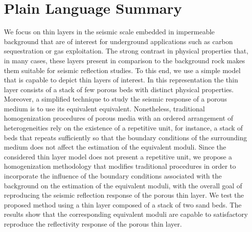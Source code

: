 \documentclass[draft]{agujournal2019}
\begin{document}
\section*{Plain Language Summary}
We focus on thin layers in the seismic scale embedded in impermeable background that are of interest for underground applications such as carbon sequestration or gas exploitation. The strong contrast in physical properties that, in many cases, these layers present in comparison to the background rock makes them suitable for seismic reflection studies. To this end, we use a simple model that is capable to depict thin layers of interest. In this representation the thin layer consists of a stack of few porous beds with distinct physical properties. Moreover, a simplified technique to study the seismic response of a porous medium is to use its equivalent equivalent. Nonetheless, traditional homogenization procedures of porous media with an ordered arrangement of heterogeneities rely on the existence of a repetitive unit, for instance, a stack of beds that repeats sufficiently so that the boundary conditions of the surrounding medium does not affect the estimation of the equivalent moduli. Since the considered thin layer model does not present a repetitive unit, we propose a homogenization methodology that modifies traditional procedures in order to incorporate the influence of the boundary conditions associated with the background on the estimation of the equivalent moduli, with the overall goal of reproducing the seismic reflection response of the porous thin layer. We test the proposed method using a thin layer composed of a stack of two sand beds. The results show that the corresponding equivalent moduli are capable to satisfactory reproduce the reflectivity response of the porous thin layer.

%
%

%

\end{document}
